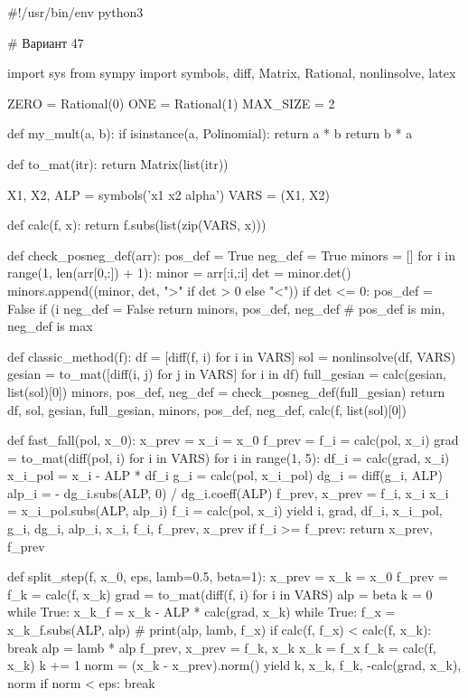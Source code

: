 \documentclass[14pt,a4paper]{extarticle}
\theoremstyle{definition}
\renewcommand{\[}{\begin{dmath*}[compact]}
\renewcommand{\]}{\end{dmath*}}
\begin{document}
\begin{pythoncode}
#!/usr/bin/env python3

# Вариант 47

import sys
from sympy import symbols, diff, Matrix, Rational, nonlinsolve, latex

ZERO = Rational(0)
ONE = Rational(1)
MAX_SIZE = 2

def my_mult(a, b):
    if isinstance(a, Polinomial):
        return a * b
    return b * a

def to_mat(itr):
    return Matrix(list(itr))

X1, X2, ALP = symbols('x1 x2 alpha')
VARS = (X1, X2)

def calc(f, x):
    return f.subs(list(zip(VARS, x)))

def check_posneg_def(arr):
    pos_def = True
    neg_def = True
    minors = []
    for i in range(1, len(arr[0,:]) + 1):
        minor = arr[:i,:i]
        det = minor.det()
        minors.append((minor, det, ">" if det > 0 else "<"))
        if det <= 0:
            pos_def = False
        if (i %
            neg_def = False
    return minors, pos_def, neg_def # pos_def is min, neg_def is max


def classic_method(f):
    df = [diff(f, i) for i in VARS]
    sol = nonlinsolve(df, VARS)
    gesian = to_mat([diff(i, j) for j in VARS] for i in df)
    full_gesian = calc(gesian, list(sol)[0])
    minors, pos_def, neg_def = check_posneg_def(full_gesian)
    return df, sol, gesian, full_gesian, minors, pos_def, neg_def, calc(f, list(sol)[0])


def fast_fall(pol, x_0):
    x_prev = x_i = x_0
    f_prev = f_i = calc(pol, x_i)
    grad = to_mat(diff(pol, i) for i in VARS)
    for i in range(1, 5):
        df_i = calc(grad, x_i)
        x_i_pol = x_i - ALP * df_i
        g_i = calc(pol, x_i_pol)
        dg_i = diff(g_i, ALP)
        alp_i = - dg_i.subs(ALP, 0) / dg_i.coeff(ALP)
        f_prev, x_prev = f_i, x_i
        x_i = x_i_pol.subs(ALP, alp_i)
        f_i = calc(pol, x_i)
        yield i, grad, df_i, x_i_pol, g_i, dg_i, alp_i, x_i, f_i, f_prev, x_prev
        if f_i >= f_prev:
            return x_prev, f_prev

def split_step(f, x_0, eps, lamb=0.5, beta=1):
    x_prev = x_k = x_0
    f_prev = f_k = calc(f, x_k)
    grad = to_mat(diff(f, i) for i in VARS)
    alp = beta
    k = 0
    while True:
        x_k_f = x_k - ALP * calc(grad, x_k)
        while True:
            f_x = x_k_f.subs(ALP, alp)
            # print(alp, lamb, f_x)
            if calc(f, f_x) < calc(f, x_k):
                break
            alp = lamb * alp
        f_prev, x_prev = f_k, x_k
        x_k = f_x
        f_k = calc(f, x_k)
        k += 1
        norm = (x_k - x_prev).norm()
        yield k, x_k, f_k, -calc(grad, x_k), norm
        if norm < eps:
            break



\end{pythoncode}
\end{document}
